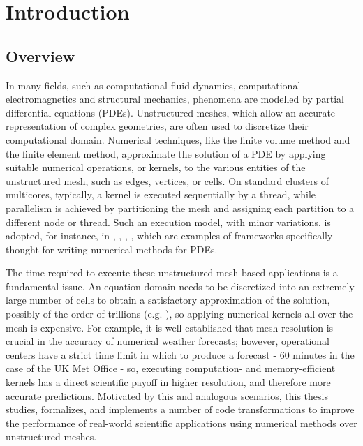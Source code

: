 \chapter{Introduction}
\section{Overview}
In many fields, such as computational fluid dynamics, computational
electromagnetics and structural mechanics, phenomena are modelled by
partial differential equations (PDEs). Unstructured meshes, which
allow an accurate representation of complex geometries, are often used 
to discretize their computational domain. Numerical techniques, like the
finite volume method and the finite element method, approximate the solution 
of a PDE by applying suitable numerical operations, or kernels, to the 
various entities of the unstructured mesh, such as edges, vertices, or
cells. On standard clusters of multicores, typically, a kernel is
executed sequentially by a thread, while parallelism is achieved by
partitioning the mesh and assigning each partition to a different node
or thread. Such an execution model, with minor variations, is adopted,
for instance, in \cite{pyop2isc}, \cite{Fenics}, \cite{fluidity_manual_v4}, \cite{lizst}, which
are examples of frameworks specifically thought for writing numerical methods for PDEs.

The time required to execute these unstructured-mesh-based applications is a fundamental issue.
An equation domain needs to be discretized into an extremely
large number of cells to obtain a satisfactory approximation
of the solution, possibly of the order of trillions
(e.g. \cite{Rossinelli2013}), so applying numerical kernels all over the mesh is expensive. 
For example, it is well-established that mesh resolution is crucial in the accuracy of numerical weather
forecasts; however, operational centers have a strict time
limit in which to produce a forecast - 60 minutes in the case of the
UK Met Office - so, executing computation- and memory-efficient 
kernels has a direct scientific payoff in higher resolution, and 
therefore more accurate predictions. Motivated by this and analogous scenarios, 
this thesis studies, formalizes, and implements a number of
code transformations to improve the performance of real-world scientific 
applications using numerical methods over unstructured meshes. 

